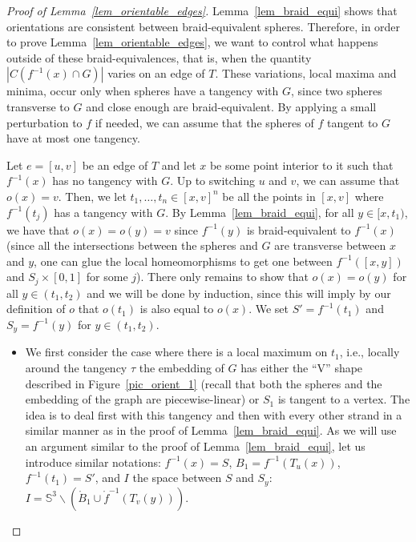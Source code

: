 \documentclass[11pt,a4paper]{article}
\newcommand{\Sp}{\mathbb S}
\begin{document}
\begin{proof}[Proof of Lemma~\ref{lem_orientable_edges}]
  Lemma~\ref{lem_braid_equi} shows that orientations are consistent between braid-equivalent spheres. Therefore, in order to prove Lemma~\ref{lem_orientable_edges}, we want to control what happens outside of these braid-equivalences, that is, when the quantity $|C(f^{-1} (x) \cap G)|$ varies on an edge of $T$. These variations, local maxima and minima, occur only when spheres have a tangency with $G$, since two spheres transverse to $G$ and close enough are braid-equivalent. By applying a small perturbation to $f$ if needed, we can assume that the spheres of $f$ tangent to $G$ have at most one tangency. 

Let $e = [u,v]$ be an edge of $T$ and let $x$ be some point interior to it such that $f^{-1} (x)$ has no tangency with $G$. Up to switching $u$ and $v$, we can assume that $o(x) = v$. Then, we let $t_1, \ldots, t_n \in [x,v]^n$ be all the points in $[x,v]$ where $f^{-1}(t_j)$ has a tangency with $G$. By Lemma~\ref{lem_braid_equi}, for all $y \in [x,t_1)$, we have that $o(x) = o(y) =v$ since $f^{-1} (y)$ is braid-equivalent to $f^{-1}(x)$ (since all the intersections between the spheres and $G$ are transverse between $x$ and $y$, one can glue the local homeomorphisms to get one between $f^{-1} ([x,y])$ and $S_j \times [0,1]$ for some $j$). There only remains to show that $o(x) = o(y)$ for all $y \in (t_1, t_2)$ and we will be done by induction, since this will imply by our definition of $o$ that $o(t_1)$ is also equal to $o(x)$. 
 We set $S' = f^{-1} (t_1)$ and $S_y = f^{-1} (y)$ for $y \in (t_1,t_2)$.


\begin{itemize}
\item We first consider the case where there is a local maximum on $t_1$, i.e., locally around the tangency $\tau$ the embedding of $G$ has either the ``V'' shape described in Figure~\ref{pic_orient_1} (recall that both the spheres and the embedding of the graph are piecewise-linear) or $S_1$ is tangent to a vertex.
The idea is to deal first with this tangency and then with every other strand in a similar manner as in the proof of Lemma~\ref{lem_braid_equi}. As we will use an argument similar to the proof of Lemma~\ref{lem_braid_equi}, let us introduce similar notations: $f^{-1} (x) = S$,  $B_1 = f^{-1} (T_u(x))$, $f^{-1} (t_1) = S'$, and $I$ the space between $S$ and $S_y$: $I = \Sp^3 \smallsetminus (\mathring B_1 \cup \mathring f^{-1} (T_v(y)))$.



\end{itemize}
\end{proof}
\end{document}
